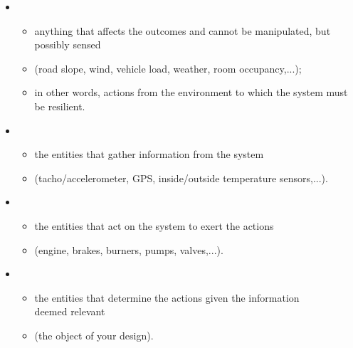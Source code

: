 \begin{frame}
\myPause
 \begin{itemize}[<+-| alert@+>]
 \item {}
       \begin{itemize}[<+-| alert@+>]
       \item[] anything that affects the outcomes and cannot be manipulated, but possibly sensed
       \item[] (road slope, wind, vehicle load, weather, room occupancy,...);
       \item[] in other words, actions from the environment to which the system must be resilient.
       \end{itemize}
 \item {}
       \begin{itemize}[<+-| alert@+>]
       \item[] the entities that gather information from the system
       \item[] (tacho/accelerometer, GPS, inside/outside temperature sensors,...).
       \end{itemize}
 \item {}
       \begin{itemize}[<+-| alert@+>]
       \item[] the entities that act on the system to exert the actions
       \item[] (engine, brakes, burners, pumps, valves,...).
       \end{itemize}
 \item {}
       \begin{itemize}[<+-| alert@+>]
       \item[] the entities that determine the actions given the information\\
               deemed relevant\\
       \item[] (the object of your design).
       \end{itemize}
 \end{itemize}
\end{frame}

